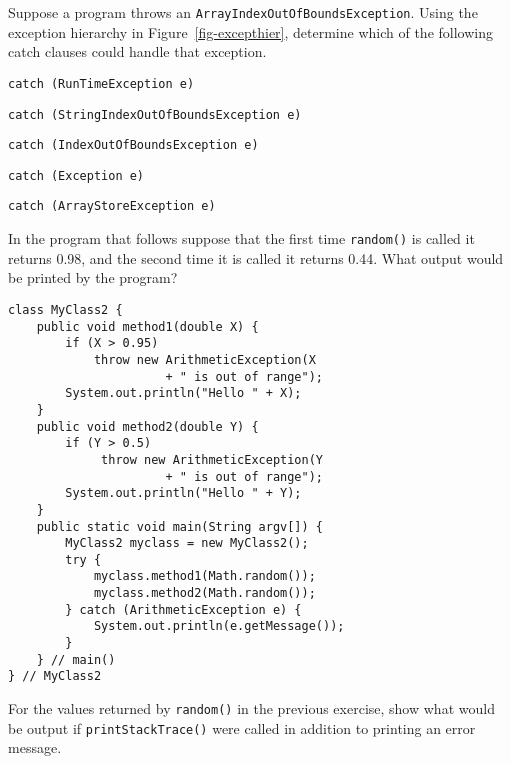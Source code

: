 \begin{SSTUDY}

\item  Suppose a program throws an {\tt ArrayIndexOutOf\-Bounds\-Exception}.
Using the exception hierarchy in Figure~\ref{fig-excepthier},
determine which of the following catch clauses could handle
that exception.

\begin{EXRLL}
\item  {\tt catch (RunTimeException e) {}}                 
\item  {\tt catch (StringIndexOutOfBoundsException e) {}}  
\item  {\tt catch (IndexOutOfBoundsException e) {}}        
\item  {\tt catch (Exception e) {}}                        
\item  {\tt catch (ArrayStoreException e) {}}              
\end{EXRLL}


\item  In the  program that follows suppose that the first time {\tt random()}
is called it returns 0.98, and the second time it is called it returns
0.44.  What output would be printed by the program?

\begin{jjjlisting}
\begin{lstlisting}
class MyClass2 {
    public void method1(double X) {
        if (X > 0.95)
            throw new ArithmeticException(X 
                      + " is out of range");
        System.out.println("Hello " + X);
    }
    public void method2(double Y) {
        if (Y > 0.5)
             throw new ArithmeticException(Y 
                      + " is out of range");
        System.out.println("Hello " + Y);
    }
    public static void main(String argv[]) {
        MyClass2 myclass = new MyClass2();
        try {
            myclass.method1(Math.random());
            myclass.method2(Math.random());
        } catch (ArithmeticException e) {
            System.out.println(e.getMessage());
        }
    } // main()
} // MyClass2
\end{lstlisting}
\end{jjjlisting}

\item  For the values returned by {\tt random()} in the previous exercise,
show what would be output if {\tt printStackTrace()} were called
in addition to printing an error message.



\end{SSTUDY}
